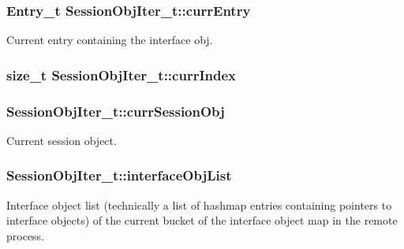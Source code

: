 \subsubsection[{\texorpdfstring{curr\+Entry}{currEntry}}]{\setlength{\rightskip}{0pt plus 5cm}Entry\+\_\+t Session\+Obj\+Iter\+\_\+t\+::curr\+Entry}\hypertarget{struct_session_obj_iter__t_a08cfe30502e07b80131a08cdf51b1e36}{}\label{struct_session_obj_iter__t_a08cfe30502e07b80131a08cdf51b1e36}


Current entry containing the interface obj. 

\subsubsection[{\texorpdfstring{curr\+Index}{currIndex}}]{\setlength{\rightskip}{0pt plus 5cm}size\+\_\+t Session\+Obj\+Iter\+\_\+t\+::curr\+Index}\hypertarget{struct_session_obj_iter__t_a8de68cd8f6a47d70d8427383bf15ef86}{}\label{struct_session_obj_iter__t_a8de68cd8f6a47d70d8427383bf15ef86}
\subsubsection[{\texorpdfstring{curr\+Session\+Obj}{currSessionObj}}]{ Session\+Obj\+Iter\+\_\+t\+::curr\+Session\+Obj}\hypertarget{struct_session_obj_iter__t_ad1c97a44dc86ff59b2feb8b497ddc890}{}\label{struct_session_obj_iter__t_ad1c97a44dc86ff59b2feb8b497ddc890}


Current session object. 

\subsubsection[{\texorpdfstring{interface\+Obj\+List}{interfaceObjList}}]{ Session\+Obj\+Iter\+\_\+t\+::interface\+Obj\+List}\hypertarget{struct_session_obj_iter__t_a4d36561cabb15feacf32451f8c6df3bb}{}\label{struct_session_obj_iter__t_a4d36561cabb15feacf32451f8c6df3bb}
Interface object list (technically a list of hashmap entries containing pointers to interface objects) of the current bucket of the interface object map in the remote process. 
